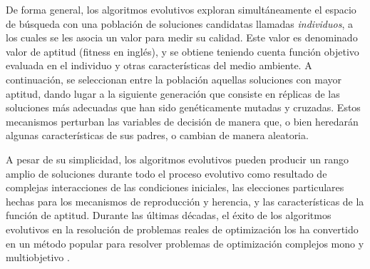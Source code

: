 De forma general, los algoritmos evolutivos exploran simultáneamente el espacio de búsqueda con una población de soluciones candidatas llamadas \textit{individuos}, a los cuales se les asocia un valor para medir su calidad. Este valor es denominado valor de aptitud (fitness en inglés), y se obtiene teniendo cuenta función objetivo evaluada en el individuo y otras características del medio ambiente. A continuación, se seleccionan entre la población aquellas soluciones con mayor aptitud, dando lugar a la siguiente generación que consiste en réplicas de las soluciones más adecuadas que han sido genéticamente mutadas y cruzadas. Estos mecanismos perturban las variables de decisión de manera que, o bien heredarán algunas características de sus padres, o cambian de manera aleatoria. 

A pesar de su simplicidad, los algoritmos evolutivos pueden producir un rango amplio de soluciones durante todo el proceso evolutivo como resultado de complejas interacciones de las condiciones iniciales, las elecciones particulares hechas para los mecanismos de reproducción y herencia, y las características de la función de aptitud. Durante las últimas décadas, el éxito de los algoritmos evolutivos en la resolución de problemas reales de optimización los ha convertido en un método popular para resolver problemas de optimización complejos mono y multiobjetivo \cite{deb2001multi}.

